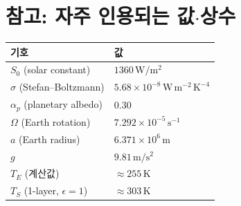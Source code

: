 \documentclass[11pt,a4paper]{article}
\begin{document}
\section*{참고: 자주 인용되는 값$\cdot$상수}

\begin{center}
\begin{tabular}{ll}
\hline
기호 & 값 \\
\hline
$S_0$ (solar constant) & $1360\,\mathrm{W/m^2}$ \\
$\sigma$ (Stefan--Boltzmann) & $5.68\times 10^{-8}\,\mathrm{W\,m^{-2}\,K^{-4}}$ \\
$\alpha_p$ (planetary albedo) & $0.30$ \\
$\Omega$ (Earth rotation) & $7.292\times 10^{-5}\,\mathrm{s^{-1}}$ \\
$a$ (Earth radius) & $6.371\times 10^{6}\,\mathrm{m}$ \\
$g$ & $9.81\,\mathrm{m/s^2}$ \\
$T_E$ (계산값) & $\approx 255\,\mathrm{K}$ \\
$T_S$ (1-layer, $\epsilon=1$) & $\approx 303\,\mathrm{K}$ \\
\hline
\end{tabular}
\end{center}
\end{document}
